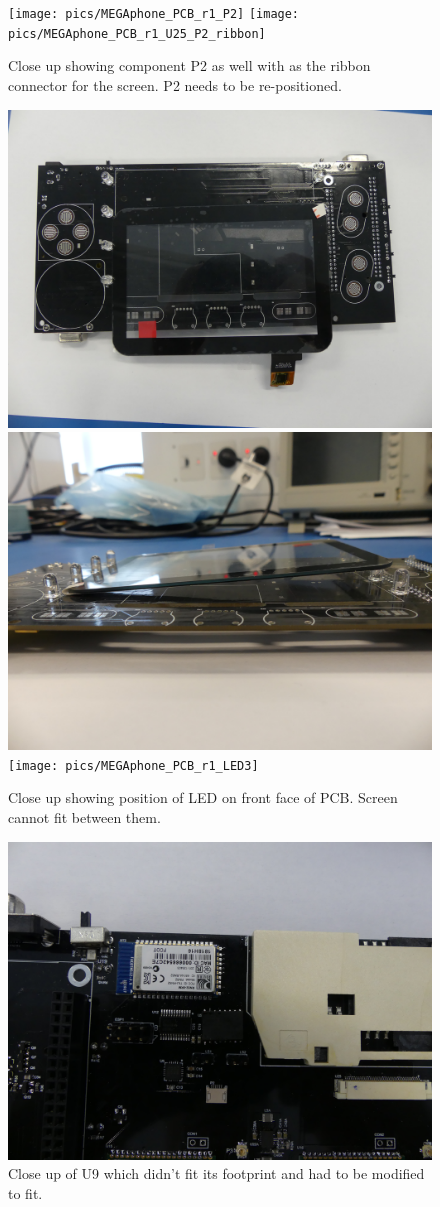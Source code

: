 \begin{figure} \begin{center}
\texttt{[image: pics/MEGAphone\_PCB\_r1\_P2]}
\texttt{[image: pics/MEGAphone\_PCB\_r1\_U25\_P2\_ribbon]}
\end{center} 
\caption{Close up showing component P2 as well with as the ribbon connector for the screen. P2 needs to be re-positioned. \\}
\label{MEGAphone_PCB_r1_P2}
\end{figure}

\begin{figure} \begin{center}
\includegraphics[width=.3\linewidth]{pics/MEGAphone_PCB_r1_LED1}
\includegraphics[width=.3\linewidth]{pics/MEGAphone_PCB_r1_LED2}
\texttt{[image: pics/MEGAphone\_PCB\_r1\_LED3]}
\end{center} 
\caption{Close up showing position of LED on front face of PCB. Screen cannot fit between them. \\}
\label{MEGAphone_PCB_r1_LED}
\end{figure}

\begin{figure} \begin{center}
\includegraphics[width=.3\linewidth]{pics/MEGAphone_PCB_r1_U9}
\end{center} 
\caption{Close up of U9 which didn't fit its footprint and had to be modified to fit. \\}
\label{MEGAphone_PCB_r1_U9}
\end{figure}

